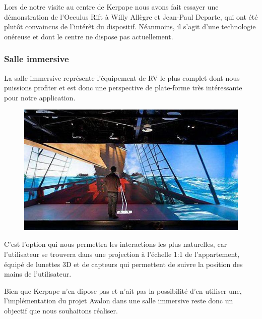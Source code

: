 Lors de notre visite au centre de Kerpape nous avons fait essayer une démonstration de l'Occulus Rift à Willy Allègre et Jean-Paul Departe, qui ont été plutôt convaincus de l'intérêt du dispositif. Néanmoins, il s'agit d'une technologie onéreuse et dont le centre ne dispose pas actuellement. 

\subsubsection{Salle immersive}
La salle immersive représente l'équipement de RV le plus complet dont nous puissions profiter et est donc une perspective de plate-forme très intéressante pour notre application. 
\begin{figure}
	\centering
	\includegraphics[scale=0.5]{2-Specifications/img-utilisateur/immersia.jpg}
\end{figure}
C'est l'option qui nous permettra les interactions les plus naturelles, car l'utilisateur se trouvera dans une projection à l'échelle 1:1 de l'appartement, équipé de lunettes 3D et de capteurs qui permettent de suivre la position des mains de l'utilisateur. \newline

Bien que Kerpape n'en dipose pas et n'ait pas la possibilité d'en utiliser une, l'implémentation du projet Avalon dans une salle immersive reste donc un objectif que nous souhaitons réaliser. 